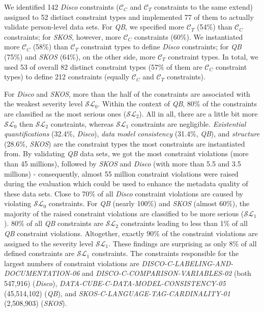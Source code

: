 \documentclass{llncs}
\begin{document}
We identified 142 \emph{Disco} constraints ($\mathcal{C}_{C}$ and $\mathcal{C}_{T}$ constraints to the same extend) assigned to 52 distinct constraint types and implemented 77 of them to actually validate person-level data sets.  
For \emph{QB}, we specified more $\mathcal{C}_{T}$ (54\%) than $\mathcal{C}_{C}$ constraints; for \emph{SKOS}, however, more $\mathcal{C}_{C}$ constraints (60\%).
We instantiated more $\mathcal{C}_{C}$ (58\%) than $\mathcal{C}_{T}$ constraint types to define \emph{Disco} constraints; 
for \emph{QB} (75\%) and \emph{SKOS} (64\%), on the other side, more $\mathcal{C}_{T}$ constraint types. 
In total, we used 53 of overall 82 distinct constraint types (57\% of them are $\mathcal{C}_{C}$ constraint types) to define 212 constraints (equally $\mathcal{C}_{C}$ and $\mathcal{C}_{T}$ constraints).

For \emph{Disco} and \emph{SKOS}, more than the half of the constraints are associated with the weakest severity level $\mathcal{SL}_{0}$.
Within the context of \emph{QB}, 80\% of the constraints are classified as the most serious ones ($\mathcal{SL}_{2}$).
All in all, there are a little bit more $\mathcal{SL}_{0}$ then $\mathcal{SL}_{2}$ constraints, whereas $\mathcal{SL}_{1}$ constraints are negligible.
\emph{Existential quantifications} (32.4\%, \emph{Disco}), \emph{data model consistency} (31.4\%, \emph{QB}), and \emph{structure} (28.6\%, \emph{SKOS}) are the constraint types the most constraints are instantiated from.
By validating \emph{QB} data sets, we got the most constraint violations (more than 45 millions), followed by \emph{SKOS} and \emph{Disco} (with more than 5.5 and 3.5 millions) - consequently, almost 55 million constraint violations were raised during the evaluation which could be used to enhance the metadata quality of these data sets.  
Close to 70\% of all \emph{Disco} constraint violations are caused by violating $\mathcal{SL}_{0}$ constraints.
For \emph{QB} (nearly 100\%) and \emph{SKOS} (almost 60\%), the majority of the raised constraint violations are classified to be more serious ($\mathcal{SL}_{1}$).
80\% of all \emph{QB} constraints are $\mathcal{SL}_{2}$ constraints leading to less than 1\% of all \emph{QB} constraint violations.
Altogether, exactly 90\% of the constraint violations are assigned to the severity level $\mathcal{SL}_{1}$.
These findings are surprising as only 8\% of all defined constraints are $\mathcal{SL}_{1}$ constraints.
The constraints responsible for the largest numbers of constraint violations are \emph{DISCO-C-LABELING-AND-DOCUMENTATION-06} and \emph{DISCO-C-COMPARISON-VARIABLES-02} (both 547,916) (\emph{Disco}), \emph{DATA-CUBE-C-DATA-MODEL-CONSISTENCY-05} (45,514,102) (\emph{QB}), and \emph{SKOS-C-LANGUAGE-TAG-CARDINALITY-01} (2,508,903) (\emph{SKOS}).
\end{document}
